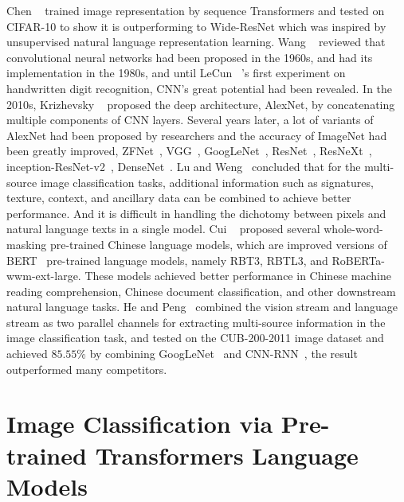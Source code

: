 \documentclass[review]{cvpr}
\begin{document}
  Chen \etal~\cite{chen2020generative} trained image representation by sequence Transformers and tested on CIFAR-10 to show it is outperforming to Wide-ResNet
which was inspired by unsupervised natural language representation learning.
  Wang \etal~\cite{wang2019development} reviewed that convolutional neural networks had been proposed in the 1960s, and had its implementation in the 1980s,
and until LeCun \etal~\cite{lecun1990handwritten}'s first experiment on handwritten digit recognition, CNN's great potential had been revealed.
  In the 2010s, Krizhevsky \etal~\cite{krizhevsky2012imagenet} proposed the deep architecture, AlexNet, by concatenating multiple components of CNN layers.
Several years later, a lot of variants of AlexNet had been proposed by researchers and the accuracy of ImageNet had been greatly improved, \eg ZFNet~\cite{zeiler2014visualizing}, VGG~\cite{simonyan2014very}, GoogLeNet~\cite{szegedy2015going}, ResNet~\cite{he2016deep},
 ResNeXt~\cite{xie2017aggregated}, inception-ResNet-v2~\cite{szegedy2016inception}, DenseNet~\cite{huang2016deep}.
  Lu and Weng~\cite{lu2007survey} concluded that for the multi-source image classification tasks, additional information such as signatures, texture, context, and ancillary data can be combined to achieve better performance.
And it is difficult in handling the dichotomy between pixels and natural language texts in a single model.
  Cui \etal~\cite{cui2020revisiting} proposed several whole-word-masking pre-trained Chinese language models,
which are improved versions of BERT~\cite{devlin2019bert} pre-trained language models, namely RBT3, RBTL3, and RoBERTa-wwm-ext-large.
These models achieved better performance in Chinese machine reading comprehension, Chinese document classification, and other downstream natural language tasks.
  He and Peng~\cite{he2017fine} combined the vision stream and language stream as two parallel channels for extracting multi-source information in the image classification task,
and tested on the CUB-200-2011 image dataset and achieved $85.55\%$ by combining GoogLeNet~\cite{szegedy2015going} and CNN-RNN~\cite{reed2016learning}, the result outperformed many competitors.



\section{Image Classification via Pre-trained Transformers Language Models}
\end{document}
